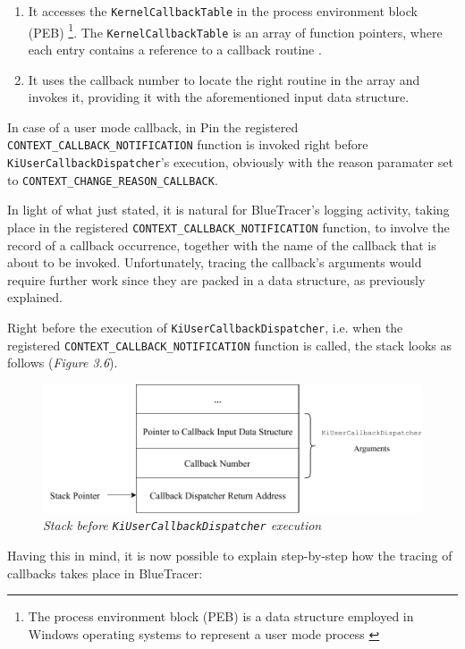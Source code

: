 \begin{enumerate}
\item It accesses the \texttt{KernelCallbackTable} in the process environment block \\ (PEB) \footnote{The process environment block (PEB) is a data structure employed in Windows operating systems to represent a user mode process \cite{KCT}}. The \texttt{KernelCallbackTable} is an array of function pointers, where each entry contains a reference to a callback routine \cite{KCT}.
\item It uses the callback number to locate the right routine in the array and invokes it, providing it with the aforementioned input data structure.   
\end{enumerate}

In case of a user mode callback, in Pin the registered \texttt{CONTEXT\_CALLBACK\_NOTIFICATION} function is invoked right before \texttt{KiUserCallbackDispatcher}'s execution, obviously with the reason paramater set to \texttt{CONTEXT\_CHANGE\_REASON\_CALLBACK}. 

In light of what just stated, it is natural for BlueTracer's logging activity, taking place in the registered \texttt{CONTEXT\_CALLBACK\_NOTIFICATION} function, to involve the record of a callback occurrence, together with the name of the callback that is about to be invoked. Unfortunately, tracing the callback's arguments would require further work since they are packed in a data structure, as previously explained.

Right before the execution of \texttt{KiUserCallbackDispatcher}, i.e. when the registered \texttt{CONTEXT\_CALLBACK\_NOTIFICATION} function is called, the stack looks as follows (\textit{Figure 3.6}).
\\
\begin{figure}[h]
\centering
\includegraphics[width=1\textwidth]{Figures/StackCallback.pdf}
\caption{\textit{Stack before \texttt{KiUserCallbackDispatcher} execution}}
\end{figure}

Having this in mind, it is now possible to explain step-by-step how the tracing of callbacks takes place in BlueTracer:

